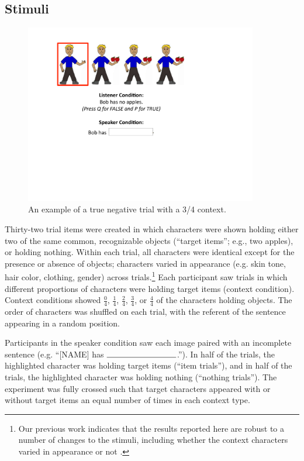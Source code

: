 \documentclass[man, noapacite]{apa2}
\begin{document}
\subsection{Stimuli}

\begin{figure}[t]
\begin{center} 
\includegraphics[width=4in]{figures/trialfig.pdf}
\caption{\label{fig:trial} An example of a true negative trial with a 3/4 context.}
\vspace{-5mm}
\end{center} 
\end{figure}

Thirty-two trial items were created in which characters were shown holding either two of the same common, recognizable objects (``target items''; e.g., two apples), or holding nothing.  Within each trial, all characters were identical except for the presence or absence of objects; characters varied in appearance (e.g. skin tone, hair color, clothing, gender) across trials.\footnote{Our previous work indicates that the results reported here are robust to a number of changes to the stimuli, including whether the context characters varied in appearance or not \cite{nordmeyer2014}.} Each participant saw trials in which different proportions of characters were holding target items (context condition).  Context conditions showed $\frac{0}{4}$, $\frac{1}{4}$, $\frac{2}{4}$, $\frac{3}{4}$, or $\frac{4}{4}$ of the characters holding objects. The order of characters was shuffled on each trial, with the referent of the sentence appearing in a random position. 

Participants in the speaker condition saw each image paired with an incomplete sentence (e.g. ``[NAME] has $\rule{3cm}{0.15mm}$.''). In half of the trials, the highlighted character was holding target items (``item trials''), and in half of the trials, the highlighted character was holding nothing (``nothing trials'').  The experiment was fully crossed such that target characters appeared with or without target items an equal number of times in each context type.  
\end{document}
